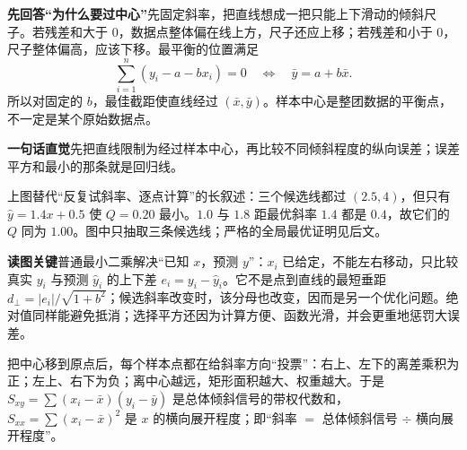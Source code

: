 \clearpage
\begin{explanationbox}
\textbf{先回答“为什么要过中心”}\quad 先固定斜率，把直线想成一把只能上下滑动的倾斜尺子。若残差和大于 $0$，数据点整体偏在线上方，尺子还应上移；若残差和小于 $0$，尺子整体偏高，应该下移。最平衡的位置满足
\[
\sum_{i=1}^n(y_i-a-bx_i)=0
\quad\Longleftrightarrow\quad
\bar y=a+b\bar x.
\]
所以对固定的 $b$，最佳截距使直线经过 $(\bar x,\bar y)$。样本中心是整团数据的平衡点，不一定是某个原始数据点。

\textbf{一句话直觉}\quad 先把直线限制为经过样本中心，再比较不同倾斜程度的纵向误差；误差平方和最小的那条就是回归线。



上图替代“反复试斜率、逐点计算”的长叙述：三个候选线都过 $(2.5,4)$，但只有 $\hat y=1.4x+0.5$ 使 $Q=0.20$ 最小。$1.0$ 与 $1.8$ 距最优斜率 $1.4$ 都是 $0.4$，故它们的 $Q$ 同为 $1.00$。图中只抽取三条候选线；严格的全局最优证明见后文。

\clearpage


\textbf{读图关键}\quad 普通最小二乘解决“已知 $x$，预测 $y$”：$x_i$ 已给定，不能左右移动，只比较真实 $y_i$ 与预测 $\hat y_i$ 的上下差 $e_i=y_i-\hat y_i$。它不是点到直线的最短垂距 $d_\perp=|e_i|/\sqrt{1+b^2}$；候选斜率改变时，该分母也改变，因而是另一个优化问题。绝对值同样能避免抵消；选择平方还因为计算方便、函数光滑，并会更重地惩罚大误差。

\clearpage


把中心移到原点后，每个样本点都在给斜率方向“投票”：右上、左下的离差乘积为正；左上、右下为负；离中心越远，矩形面积越大、权重越大。于是 $S_{xy}=\sum(x_i-\bar x)(y_i-\bar y)$ 是总体倾斜信号的带权代数和，$S_{xx}=\sum(x_i-\bar x)^2$ 是 $x$ 的横向展开程度；即“斜率 $=$ 总体倾斜信号 $\div$ 横向展开程度”。
\end{explanationbox}
